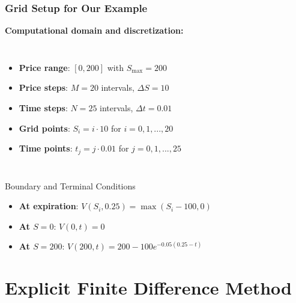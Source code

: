 \documentclass[aspectratio=169]{beamer}
\begin{document}
\begin{frame}
\frametitle{Grid Setup for Our Example}
\textbf{Computational domain and discretization:}

\begin{columns}
\begin{itemize}
\item \textbf{Price range}: \([0, 200]\) with \(S_{\max} = 200\)
\item \textbf{Price steps}: \(M = 20\) intervals, \(\Delta S = 10\)
\item \textbf{Time steps}: \(N = 25\) intervals, \(\Delta t = 0.01\)
\item \textbf{Grid points}: \(S_i = i \cdot 10\) for \(i = 0, 1, ..., 20\)
\item \textbf{Time points}: \(t_j = j \cdot 0.01\) for \(j = 0, 1, ..., 25\)
\end{itemize}

\end{columns}

\begin{block}{Boundary and Terminal Conditions}
\begin{itemize}
\item \textbf{At expiration}: \(V(S_i, 0.25) = \max(S_i - 100, 0)\)
\item \textbf{At \(S = 0\)}: \(V(0, t) = 0\)
\item \textbf{At \(S = 200\)}: \(V(200, t) = 200 - 100e^{-0.05(0.25-t)}\)
\end{itemize}
\end{block}
\end{frame}

\section{Explicit Finite Difference Method}
\end{document}
